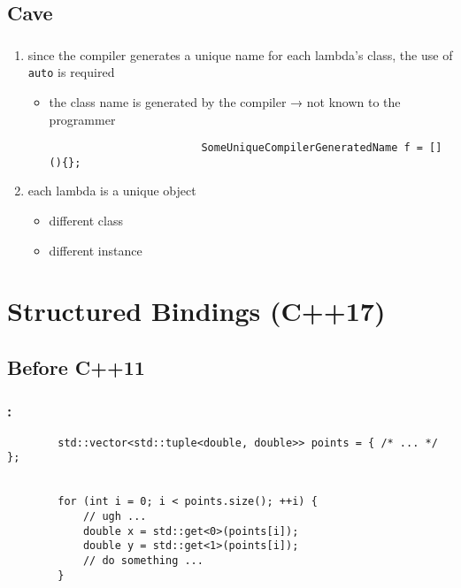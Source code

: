 \documentclass[aspectratio=43, t]{beamer}
\begin{document}
\subsection*{Cave}
\begin{frame}[fragile]
	\frametitle{\secname}

	\begin{enumerate}
		\item since the compiler generates a unique name for each lambda's class, the use of \texttt{auto} is required
			\begin{itemize}
				\item the class name is generated by the compiler → not known to the programmer
					\begin{verbatim}
						SomeUniqueCompilerGeneratedName f = [](){};
					\end{verbatim}
			\end{itemize}
		\item each lambda is a unique object
			\begin{itemize}
				\item different class
				\item different instance
			\end{itemize}
	\end{enumerate}
\end{frame}

\section*{Structured Bindings (C++17)}
\subsection*{Before C++11}
\begin{frame}[fragile]
	\frametitle{\secname\footnotemark[1]{}: \subsecname}

	\begin{verbatim}
		std::vector<std::tuple<double, double>> points = { /* ... */ };


		for (int i = 0; i < points.size(); ++i) {
			// ugh ...
			double x = std::get<0>(points[i]);
			double y = std::get<1>(points[i]);
			// do something ...
		}
	\end{verbatim}
\end{frame}
\end{document}
